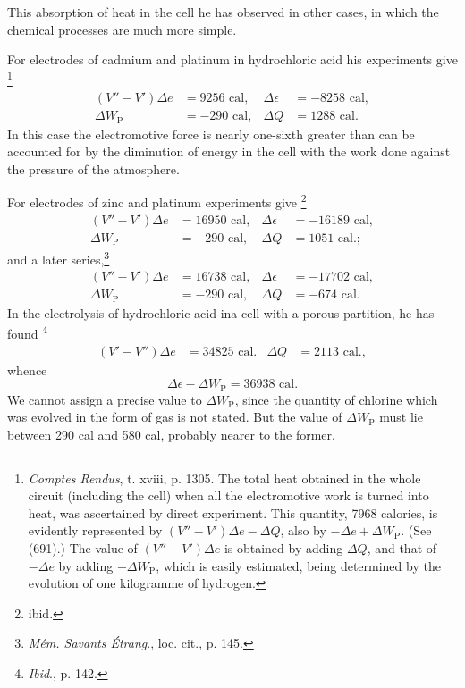 \documentclass[12pt]{article}
\begin{document}
This absorption of heat in the cell he has observed in other cases, in which the chemical processes are much more simple.

For electrodes of cadmium and platinum in hydrochloric acid his
experiments give \footnote{\textit{Comptes Rendus}, t. xviii, p. 1305. The total heat obtained in the whole circuit (including the cell) when all the electromotive work is turned into heat, was ascertained by direct experiment. This quantity, 7968 calories, is evidently represented by $( V''- V') \Delta e - \Delta Q$, also by $- \Delta e + \Delta W_\text{P}$. (See (691).) The value of $(V''  - V')\Delta e$ is obtained by adding $\Delta Q$, and that of $- \Delta e$ by adding $- \Delta W_\text{P}$, which is easily estimated, being determined by the evolution of one kilogramme of hydrogen.}
\begin{align*}(V'' - V')\Delta e &= 9256 \text{ cal},  &   \Delta \epsilon &= -8258\text{ cal},\\
\Delta W_\text{P} &= -290\text{ cal},    &   \Delta Q &= 1288\text{ cal}.\end{align*}
In this case the electromotive force is nearly one-sixth greater than can be accounted for by the diminution of energy in the cell with the work done against the pressure of the atmosphere.

For electrodes of zinc and platinum experiments give \footnote{ibid.}
\begin{align*}(V'' - V')\Delta e &= 16950 \text{ cal},  &   \Delta \epsilon &= -16189\text{ cal},\\
\Delta W_\text{P} &= -290\text{ cal},    &   \Delta Q &= 1051\text{ cal}.;\end{align*}
and a later series,\footnote{\textit{M\'{e}m. Savants \'{E}trang}., loc. cit., p. 145.}
\begin{align*}(V'' - V')\Delta e &= 16738 \text{ cal},  &   \Delta \epsilon &= -17702\text{ cal},\\
\Delta W_\text{P} &= -290\text{ cal},    &   \Delta Q &= -674\text{ cal}.\end{align*}
In the electrolysis of hydrochloric acid ina cell with a porous partition, he has found \footnote{\textit{Ibid}., p. 142.}
\begin{align*} (V' - V'') \Delta e & = 34825\text{ cal}. & \Delta Q &= 2113\text{ cal}.,\end{align*}
whence
$$\Delta \epsilon - \Delta W_\text{P} = 36938\text{ cal}.$$
We cannot assign a precise value to $\Delta W_\text{P}$, since the quantity of chlorine which was evolved in the form of gas is not stated. But the value of $\Delta W_\text{P}$ must lie between 290 cal and 580 cal, probably nearer to the former.
\end{document}
